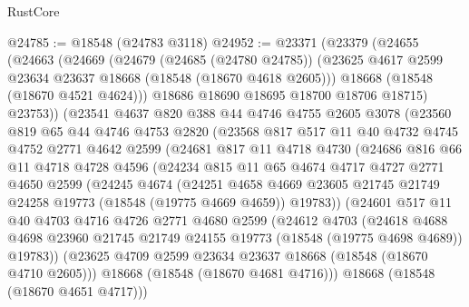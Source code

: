 \begin{lexlean}{RustCore}
\begin{coremodule}
@24785 := @18548 (@24783 @3118)
@24952 := @23371
    (@23379
      (@24655
        (@24663
          (@24669
            (@24679
              (@24685 (@24780 @24785))
              (@23625 @4617 @2599 @23634 @23637 @18668 (@18548 (@18670 @4618 @2605)))
              @18668
              (@18548 (@18670 @4521 @4624)))
            @18686
            @18690
            @18695
            @18700
            @18706
            @18715)
          @23753))
      (@23541
        @4637
        @820
        @388
        @44
        @4746
        @4755
        @2605
        @3078
        (@23560
          @819
          @65
          @44
          @4746
          @4753
          @2820
          (@23568
            @817
            @517
            @11
            @40
            @4732
            @4745
            @4752
            @2771
            @4642
            @2599
            (@24681
              @817
              @11
              @4718
              @4730
              (@24686
                @816
                @66
                @11
                @4718
                @4728
                @4596
                (@24234
                  @815
                  @11
                  @65
                  @4674
                  @4717
                  @4727
                  @2771
                  @4650
                  @2599
                  (@24245
                    @4674
                    (@24251
                      @4658
                      @4669
                      @23605
                      @21745
                      @21749
                      @24258
                      @19773
                      (@18548 (@19775 @4669 @4659))
                      @19783))
                  (@24601
                    @517
                    @11
                    @40
                    @4703
                    @4716
                    @4726
                    @2771
                    @4680
                    @2599
                    (@24612
                      @4703
                      (@24618
                        @4688
                        @4698
                        @23960
                        @21745
                        @21749
                        @24155
                        @19773
                        (@18548 (@19775 @4698 @4689))
                        @19783))
                    (@23625 @4709 @2599 @23634 @23637 @18668 (@18548 (@18670 @4710 @2605)))
                    @18668
                    (@18548 (@18670 @4681 @4716)))
                  @18668
                  (@18548 (@18670 @4651 @4717)))

\end{coremodule}
\end{lexlean}
